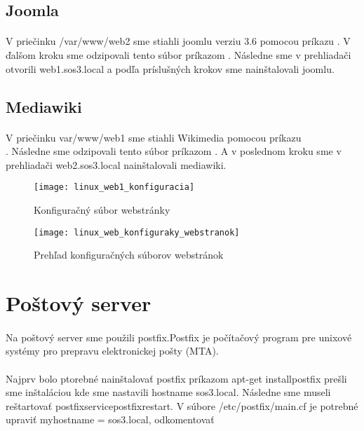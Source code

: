 \subsection{Joomla}
\paragraph{}
V priečinku /var/www/web2 sme stiahli joomlu verziu 3.6 pomocou príkazu  . V ďalšom kroku sme odzipovali tento súbor príkazom  . Nás\-ledne sme v prehliadači otvorili web1.sos3.local a podľa príslušných krokov sme nainštalovali joomlu.

\subsection{Mediawiki}
\paragraph{}
V priečinku var/www/web1 sme stiahli Wikimedia pomocou príkazu\\  . Následne sme odzipovali tento súbor príkazom  . A v poslednom kroku sme v prehliadači web2.sos3.local nainštalovali mediawiki.

\begin{figure}[!htb]
\centering
\texttt{[image: linux\_web1\_konfiguracia]}
\caption{Konfiguračný súbor webstránky}
\label{fig:x web1_config_file}
\end{figure}

\begin{figure}[!htb]
\centering
\texttt{[image: linux\_web\_konfiguraky\_webstranok]}
\caption{Prehľad konfiguračných súborov webstránok}
\label{fig:x web_config_files_list}
\end{figure}

\section{Poštový server}
\paragraph{}
Na poštový server sme použili postfix.Postfix je počítačový program pre unixové systémy pro prepravu elektronickej pošty (MTA).
\paragraph{}
Najprv bolo ptorebné nainštalovať postfix príkazom apt-get installpostfix prešli sme inštaláciou kde sme nastavili hostname sos3.local. Následne sme museli reštar\-tovať postfixservicepostfixrestart. V súbore /etc/postfix/main.cf je potrebné upraviť myhostname = sos3.local, odkomentovať\\
